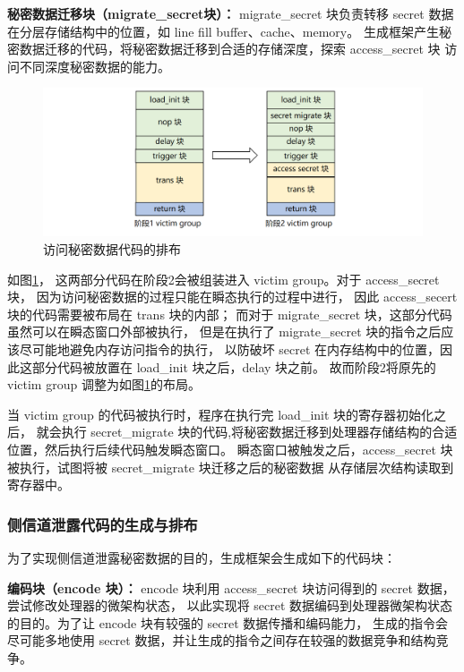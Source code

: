 \textbf{秘密数据迁移块（migrate\_secret块）：}
migrate\_secret 块负责转移 secret 数据在分层存储结构中的位置，如 line fill buffer、cache、memory。
生成框架产生秘密数据迁移的代码，将秘密数据迁移到合适的存储深度，探索 access\_secret 块
访问不同深度秘密数据的能力。\par

\begin{figure}[!h]
    \centering
    \includegraphics[width=\linewidth]{figure/paper/stage2-access-secret.png}
    \caption{访问秘密数据代码的排布}
    \label{paper:access-secret}
\end{figure}

如图\ref{paper:access-secret}，
这两部分代码在阶段2会被组装进入 victim group。对于 access\_secret 块，
因为访问秘密数据的过程只能在瞬态执行的过程中进行，
因此 access\_secert 块的代码需要被布局在 trans 块的内部；
而对于 migrate\_secret 块，这部分代码虽然可以在瞬态窗口外部被执行，
但是在执行了 migrate\_secret 块的指令之后应该尽可能地避免内存访问指令的执行，
以防破坏 secret 在内存结构中的位置，因此这部分代码被放置在 load\_init 块之后，delay 块之前。
故而阶段2将原先的 victim group 调整为如图\ref{paper:access-secret}的布局。\par

当 victim group 的代码被执行时，程序在执行完 load\_init 块的寄存器初始化之后，
就会执行 secret\_migrate 块的代码,将秘密数据迁移到处理器存储结构的合适位置，然后执行后续代码触发瞬态窗口。
瞬态窗口被触发之后，access\_secret 块被执行，试图将被 secret\_migrate 块迁移之后的秘密数据
从存储层次结构读取到寄存器中。\par

\subsubsection{侧信道泄露代码的生成与排布}

为了实现侧信道泄露秘密数据的目的，生成框架会生成如下的代码块：\par

\textbf{编码块（encode 块）：}
encode 块利用 access\_secret 块访问得到的 secret 数据，尝试修改处理器的微架构状态，
以此实现将 secret 数据编码到处理器微架构状态的目的。为了让 encode 块有较强的 secret 数据传播和编码能力，
生成的指令会尽可能多地使用 secret 数据，并让生成的指令之间存在较强的数据竞争和结构竞争。\par

